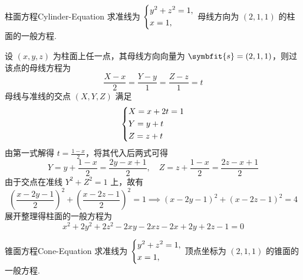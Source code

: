 \begin{problem}{柱面方程}{Cylinder-Equation}
    求准线为 $\begin{dcases} y^2 + z^2 = 1, \\ x = 1, \end{dcases}$ 母线方向为 $(2, 1, 1)$ 的柱面的一般方程.
\end{problem}

\begin{solution}
    设 $(x, y, z)$ 为柱面上任一点，其母线方向向量为 $\symbfit{s} = (2, 1, 1)$，则过该点的母线方程为
    \begin{equation}
        \frac{X - x}{2} = \frac{Y - y}{1} = \frac{Z - z}{1} = t
    \end{equation}
    母线与准线的交点 $(X, Y, Z)$ 满足
    \begin{equation}
        \begin{dcases}
            X = x + 2t = 1 \\
            Y = y + t      \\
            Z = z + t
        \end{dcases}
    \end{equation}
    由第一式解得 $t = \frac{1 - x}{2}$，将其代入后两式可得
    \begin{equation}
        Y = y + \frac{1 - x}{2} = \frac{2y - x + 1}{2}, \quad Z = z + \frac{1 - x}{2} = \frac{2z - x + 1}{2}
    \end{equation}
    由于交点在准线 $Y^2 + Z^2 = 1$ 上，故有
    \begin{equation}
        \left(\frac{x - 2y - 1}{2}\right)^2 + \left(\frac{x - 2z - 1}{2}\right)^2 = 1 \implies (x - 2y - 1)^2 + (x - 2z - 1)^2 = 4
    \end{equation}
    展开整理得柱面的一般方程为
    \begin{equation}
        \boxed{x^2 + 2y^2 + 2z^2 - 2xy - 2xz - 2x + 2y + 2z - 1 = 0}
    \end{equation}
\end{solution}


\begin{problem}{锥面方程}{Cone-Equation}
    求准线为 $\begin{dcases} y^2 + z^2 = 1, \\ x = 1, \end{dcases}$ 顶点坐标为 $(2, 1, 1)$ 的锥面的一般方程.
\end{problem}

